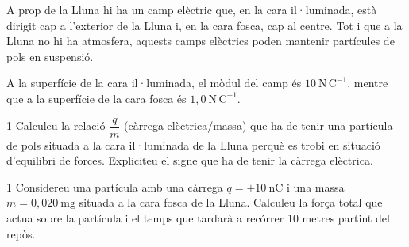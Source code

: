 A prop de la Lluna hi ha un camp elèctric que, en la cara il·luminada, està dirigit cap a l'exterior de la Lluna i, en la cara fosca, cap al centre. Tot i que a la Lluna no hi ha atmosfera, aquests camps elèctrics poden mantenir partícules de pols en suspensió.


A la superfície de la cara il·luminada, el mòdul del camp és $10\ \mathrm{N\,C^{-1}}$, mentre que a la superfície de la cara fosca és $1,0\ \mathrm{N\,C^{-1}}$.

\begin{apartat}{1}
Calculeu la relació $\dfrac{q}{m}$ (càrrega elèctrica/massa) que ha de tenir una partícula de pols situada a la cara il·luminada de la Lluna perquè es trobi en situació d'equilibri de forces. Expliciteu el signe que ha de tenir la càrrega elèctrica.
\end{apartat}

\begin{apartat}{1}
Considereu una partícula amb una càrrega $q = +10\ \mathrm{nC}$ i una massa $m = 0,020\ \mathrm{mg}$ situada a la cara fosca de la Lluna. Calculeu la força total que actua sobre la partícula i el temps que tardarà a recórrer 10 metres partint del repòs.
\end{apartat}

